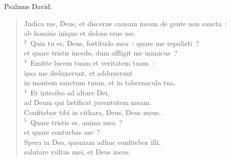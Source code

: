 \bchapter
\lettrine[lines=3,image=true,loversize=0.05,lraise=-0.03]{P}{}salmus David. \begin{flushleft}\begin{verse}\vspace{6pt}Judica me, Deus, et discerne causam meam de gente non sancta~:\\ ab homine iniquo et doloso erue me.\\
${}^{2}$~Quia tu es, Deus, fortitudo mea~: quare me repulisti~?\\ et quare tristis incedo, dum affligit me inimicus~?\\
${}^{3}$~Emitte lucem tuam et veritatem tuam~:\\ ipsa me deduxerunt, et adduxerunt\\ in montem sanctum tuum, et in tabernacula tua.\\
${}^{4}$~Et introibo ad altare Dei,\\ ad Deum qui l\ae tificat juventutem meam.\\ Confitebor tibi in cithara, Deus, Deus meus.\\
${}^{5}$~Quare tristis es, anima mea~?\\ et quare conturbas me~?\\ Spera in Deo, quoniam adhuc confitebor illi,\\ salutare vultus mei, et Deus meus.\end{verse}\end{flushleft}



